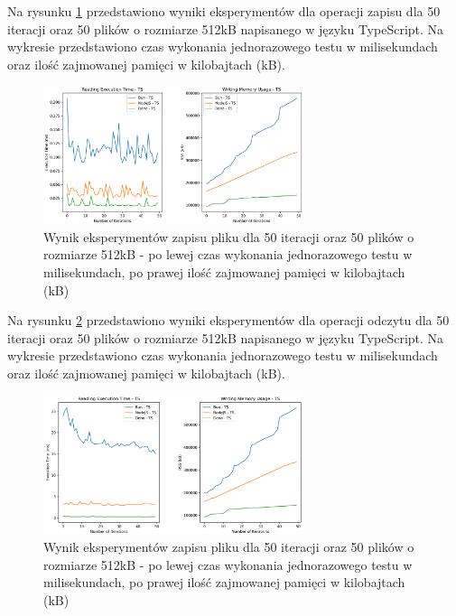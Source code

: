 Na rysunku \ref{fig:file_e1_reading_ts} przedstawiono wyniki eksperymentów dla operacji zapisu dla 50 iteracji oraz 50 plików o rozmiarze 512kB napisanego w języku TypeScript. Na wykresie przedstawiono czas wykonania jednorazowego testu w milisekundach oraz ilość zajmowanej pamięci w kilobajtach (kB).

\begin{figure}[H]
  \centering
  \includegraphics[width=0.68\textwidth]{Figures/files/files_reading_50_500_50_ts.png}
  \caption{Wynik eksperymentów zapisu pliku dla 50 iteracji oraz 50 plików o rozmiarze 512kB - po lewej czas wykonania jednorazowego testu w milisekundach, po prawej ilość zajmowanej pamięci w kilobajtach (kB)}
  \label{fig:file_e1_reading_ts}
\end{figure}

Na rysunku \ref{fig:file_e1_writing_ts} przedstawiono wyniki eksperymentów dla operacji odczytu dla 50 iteracji oraz 50 plików o rozmiarze 512kB napisanego w języku TypeScript. Na wykresie przedstawiono czas wykonania jednorazowego testu w milisekundach oraz ilość zajmowanej pamięci w kilobajtach (kB).

\begin{figure}[H]
  \centering
  \includegraphics[width=0.68\textwidth]{Figures/files/files_writing_50_500_50_ts.png}
  \caption{Wynik eksperymentów zapisu pliku dla 50 iteracji oraz 50 plików o rozmiarze 512kB - po lewej czas wykonania jednorazowego testu w milisekundach, po prawej ilość zajmowanej pamięci w kilobajtach (kB)}
  \label{fig:file_e1_writing_ts}
\end{figure}

